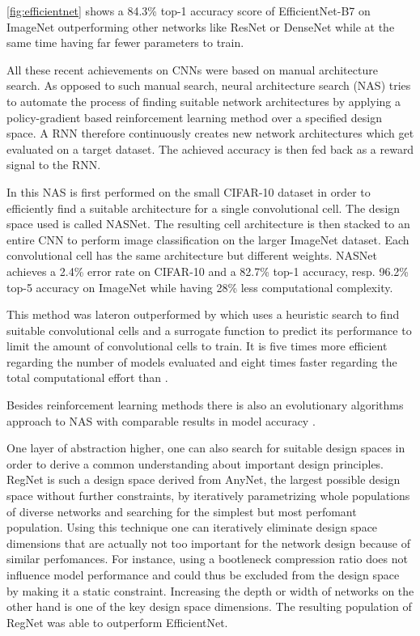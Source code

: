 \autoref{fig:efficientnet} shows a 84.3\% top-1 accuracy score of EfficientNet-B7 on ImageNet outperforming other networks like ResNet or DenseNet while at the same time having far fewer parameters to train. \cite{LeMingxingTan.2019}

All these recent achievements on CNNs were based on manual architecture search. As opposed to such manual search, neural architecture search (NAS) tries to automate the process of finding suitable network architectures by applying a policy-gradient based reinforcement learning method over a specified design space. A RNN therefore continuously creates new network architectures which get evaluated on a target dataset. The achieved accuracy is then fed back as a reward signal to the RNN. \cite{LeBarretZoph.2017}

In \cite{BarretZoph.2018} this NAS is first performed on the small CIFAR-10 dataset in order to efficiently find a suitable architecture for a single convolutional cell. The design space used is called NASNet. The resulting cell architecture is then stacked to an entire CNN to perform image classification on the larger ImageNet dataset. Each convolutional cell has the same architecture but different weights. NASNet achieves a 2.4\% error rate on CIFAR-10 and a 82.7\% top-1 accuracy, resp. 96.2\% top-5 accuracy on ImageNet while having 28\% less computational complexity. 

This method was lateron outperformed by \cite{ChenxiLiu.2018} which uses a heuristic search to find suitable convolutional cells and a surrogate function to predict its performance to limit the amount of convolutional cells to train. It is five times more efficient regarding the number of models evaluated and eight times faster regarding the total computational effort than \cite{BarretZoph.2018}. 

Besides reinforcement learning methods there is also an evolutionary algorithms approach to NAS with comparable results in model accuracy \cite{EstebanReal.2019}.

One layer of abstraction higher, one can also search for suitable design spaces in order to derive a common understanding about important design principles. RegNet is such a design space derived from AnyNet, the largest possible design space without further constraints, by iteratively parametrizing whole populations of diverse networks and searching for the simplest but most perfomant population. Using this technique one can iteratively eliminate design space dimensions that are actually not too important for the network design because of similar perfomances. For instance, using a bootleneck compression ratio does not influence model performance and could thus be excluded from the design space by making it a static constraint. Increasing the depth or width of networks on the other hand is one of the key design space dimensions. The resulting population of RegNet was able to outperform EfficientNet. \cite{IlijaRadosavovic.2020}

